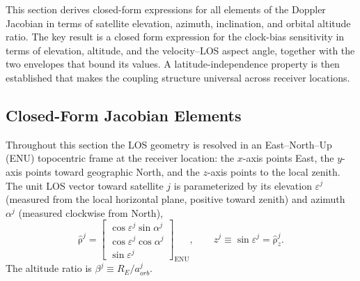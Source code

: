 \documentclass[letterpaper,times]{IONconf-v2}
\theoremstyle{plain}
\theoremstyle{remark}
\renewcommand{\vec}[1]{{\boldsymbol{\mathrm{#1}}}}
\begin{document}
This section derives closed-form expressions for all elements of the Doppler Jacobian in terms of satellite elevation, azimuth, inclination, and orbital altitude ratio. The key result is a closed form expression for the clock-bias sensitivity in terms of elevation, altitude, and the velocity--LOS aspect angle, together with the two envelopes that bound its values. A latitude-independence property %
is then established that makes the coupling structure universal across receiver locations.

\vspace{-10pt}

\subsection{Closed-Form Jacobian Elements}\label{subsec:closed_form}

Throughout this section the LOS geometry is resolved in an East--North--Up (ENU) topocentric frame at the receiver location: the $x$-axis points East, the $y$-axis points toward geographic North, and the $z$-axis points to the local zenith. The unit LOS vector toward satellite $j$ is parameterized by its elevation $\varepsilon^j$ (measured from the local horizontal plane, positive toward zenith) and azimuth $\alpha^j$ (measured clockwise from North),
%
\begin{equation}\label{eq:los_enu}
\hat{\vec\rho}^j =
\begin{bmatrix} \cos\varepsilon^j\sin\alpha^j \\ \cos\varepsilon^j\cos\alpha^j \\ \sin\varepsilon^j \end{bmatrix}_{\mathrm{ENU}},
\qquad z^j \equiv \sin\varepsilon^j = \hat{\vec\rho}_z^j .
\end{equation}
%
The altitude ratio is $\beta^j \equiv R_E/a_{orb}^j$.
\end{document}
